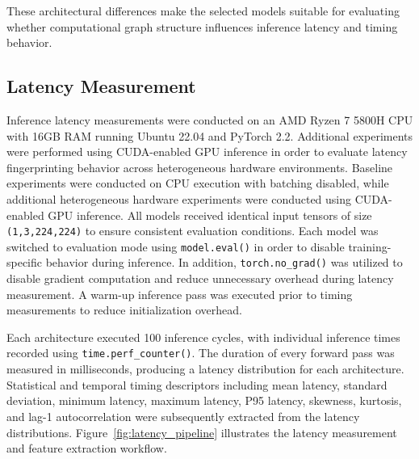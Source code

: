 \documentclass[conference]{IEEEtran}
\begin{document}
These architectural differences make the selected models suitable for evaluating whether computational graph structure influences inference latency and timing behavior.

\subsection{Latency Measurement}

Inference latency measurements were conducted on an AMD Ryzen 7 5800H CPU with 16GB RAM running Ubuntu 22.04 and PyTorch 2.2. Additional experiments were performed using CUDA-enabled GPU inference in order to evaluate latency fingerprinting behavior across heterogeneous hardware environments. Baseline experiments were conducted on CPU execution with batching disabled, while additional heterogeneous hardware experiments were conducted using CUDA-enabled GPU inference. All models received identical input tensors of size \texttt{(1,3,224,224)} to ensure consistent evaluation conditions. Each model was switched to evaluation mode using \texttt{model.eval()} in order to disable training-specific behavior during inference. In addition, \texttt{torch.no\_grad()} was utilized to disable gradient computation and reduce unnecessary overhead during latency measurement. A warm-up inference pass was executed prior to timing measurements to reduce initialization overhead.

Each architecture executed 100 inference cycles, with individual inference times recorded using \texttt{time.perf\_counter()}. The duration of every forward pass was measured in milliseconds, producing a latency distribution for each architecture. Statistical and temporal timing descriptors including mean latency, standard deviation, minimum latency, maximum latency, P95 latency, skewness, kurtosis, and lag-1 autocorrelation were subsequently extracted from the latency distributions. Figure~\ref{fig:latency_pipeline} illustrates the latency measurement and feature extraction workflow.
\end{document}
